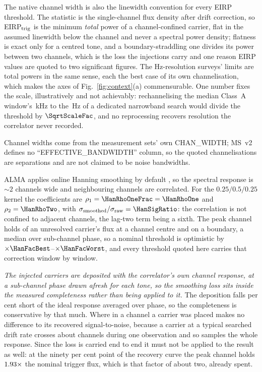 The native channel width is also the linewidth convention for every EIRP
threshold. The statistic is the single-channel flux density after drift
correction, so EIRP$_{\rm trig}$ is the minimum \emph{total} power of a
channel-confined carrier, flat in the assumed linewidth below the channel and
never a spectral power density; flatness is exact only for a centred tone,
and a boundary-straddling one divides its power between two channels, which
is the loss the injections carry and one reason EIRP values are quoted to two
significant figures. The Hz-resolution
surveys' limits are total powers in the same sense, each the best case of
its own channelisation, which makes the axes of Fig.~\ref{fig:context}(a)
commensurable. One number fixes the scale, illustratively and not
achievably: rechannelising the median Class~A window's
\SqrtScaleChanKHz\,kHz to the \SETIChanHz\,Hz of a dedicated narrowband
search would divide the threshold by $\SqrtScaleFac$, and no reprocessing
recovers resolution the correlator never recorded.

Channel widths come from the measurement sets' own CHAN\_WIDTH; MS~v2
defines no ``EFFECTIVE\_BANDWIDTH'' column, so the quoted channelisations are
separations and are not claimed to be noise bandwidths.

ALMA applies online Hanning smoothing by default \citep{ALMAHandbook}, so
the spectral response is ${\sim}2$ channels wide and neighbouring channels
are correlated. For the $0.25/0.5/0.25$ kernel the coefficients
are $\rho_1=\HanRhoOneFrac=\HanRhoOne$ and $\rho_2=\HanRhoTwo$, with
$\sigma_{\rm smoothed}/\sigma_{\rm raw}=\HanSigRatio$: the correlation is
not confined to adjacent channels, the lag-two term being a sixth. The peak
channel holds \HanBest{} of an unresolved carrier's flux at a channel centre
and \HanWorst{} on a boundary, a median \HanMed{} over sub-channel phase, so
a nominal threshold is optimistic by
$\times\HanFacBest$--$\times\HanFacWorst$, and every threshold quoted here
carries that correction window by window.

\emph{The injected carriers are deposited with the correlator's own channel
response, at a sub-channel phase drawn afresh for each tone, so the smoothing
loss sits inside the measured completeness rather than being applied to it.}
The deposition falls \InjShortPct{} per cent short of the ideal response
averaged over phase, so the completeness is conservative by that much. Where
in a channel a carrier was placed makes no difference to its recovered
signal-to-noise, because a carrier at a typical searched drift rate crosses
about \InjDriftChan{} channels during one observation and so samples the
whole response. Since the loss is carried end to end it must not be applied
to the result as well: at the ninety per cent point of the recovery curve the
peak channel holds $1.93\times$ the nominal trigger flux, which
is that factor of about two, already spent.

